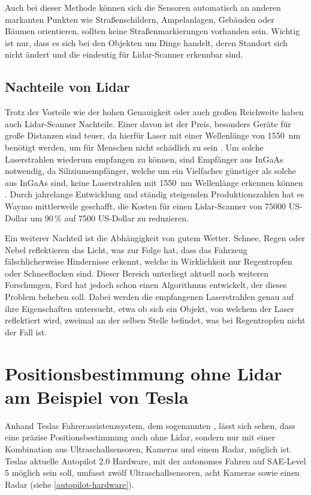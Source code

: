 Auch bei dieser Methode können sich die Sensoren automatisch an anderen markanten Punkten wie Straßenschildern, Ampelanlagen, Gebäuden oder Bäumen orientieren, sollten keine Straßenmarkierungen vorhanden sein. Wichtig ist nur, dass es sich bei den Objekten um Dinge handelt, deren Standort sich nicht ändert und die eindeutig für \acs{Lidar}-Scanner erkennbar sind.

\subsection{Nachteile von Lidar}

Trotz der Vorteile wie der hohen Genauigkeit oder auch großen Reichweite haben auch \acs{Lidar}-Scanner Nachteile. Einer davon ist der Preis, besonders Geräte für große Distanzen sind teuer, da hierfür Laser mit einer Wellenlänge von \SI{1550}{\nano\meter} benötigt werden, um für Menschen nicht schädlich zu sein . Um solche Laserstrahlen wiederum empfangen zu können, sind Empfänger aus \ac{InGaAs} notwendig, da Siliziumempfänger, welche um ein Vielfaches günstiger als solche aus \ac{InGaAs} sind, keine Laserstrahlen mit \SI{1550}{\nano\meter} Wellenlänge erkennen können . Durch jahrelange Entwicklung und ständig steigenden Produktionszahlen hat es Waymo mittlerweile geschafft, die Kosten für einen \acs{Lidar}-Scanner von \num{75000} US-Dollar um 90\,\% auf \num{7500} US-Dollar zu reduzieren. 

Ein weiterer Nachteil ist die Abhängigkeit von gutem Wetter. Schnee, Regen oder Nebel reflektieren das Licht, was zur Folge hat, dass das Fahrzeug fälschlicherweise Hindernisse erkennt, welche in Wirklichkeit nur Regentropfen oder Schneeflocken sind. Dieser Bereich unterliegt aktuell noch weiteren Forschungen, Ford hat jedoch schon einen Algorithmus entwickelt, der dieses Problem beheben soll. Dabei werden die empfangenen Laserstrahlen genau auf ihre Eigenschaften untersucht, etwa ob sich ein Objekt, von welchem der Laser reflektiert wird, zweimal an der selben Stelle befindet, was bei Regentropfen nicht der Fall ist.


\section{Positionsbestimmung ohne Lidar am Beispiel von Tesla}\label{section-2-3}

Anhand Teslas Fahrerassistenzsystem, dem sogenannten , lässt sich sehen, dass eine präzise Positionsbestimmung auch ohne \acs{Lidar}, sondern nur mit einer Kombination aus Ultraschallsensoren, Kameras und einem \acs{Radar}, möglich ist. Teslas aktuelle Autopilot 2.0 Hardware, mit der autonomes Fahren auf \ac{SAE}-Level 5 möglich sein soll, umfasst zwölf Ultraschallsensoren, acht Kameras sowie einen \acs{Radar} (siehe \ref{autopilot-hardware}).

